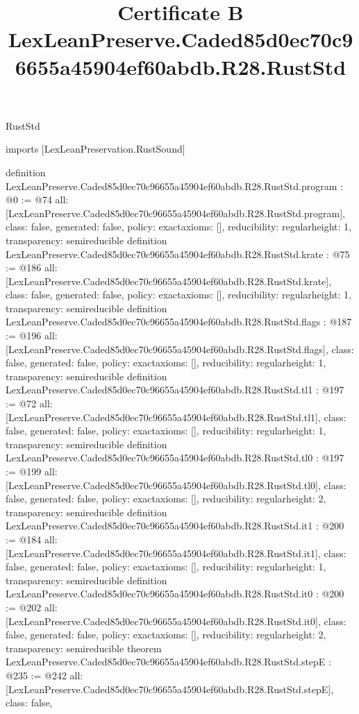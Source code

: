 \begin{lexlean}{RustStd}
\title{Certificate B LexLeanPreserve.Caded85d0ec70c96655a45904ef60abdb.R28.RustStd}
\begin{coremodule}
imports [LexLeanPreservation.RustSound]

definition LexLeanPreserve.Caded85d0ec70c96655a45904ef60abdb.R28.RustStd.program : @0 := @74 {
  all: [LexLeanPreserve.Caded85d0ec70c96655a45904ef60abdb.R28.RustStd.program],
  class: false,
  generated: false,
  policy: exact{axioms: []},
  reducibility: regular{height: 1},
  transparency: semireducible
}
definition LexLeanPreserve.Caded85d0ec70c96655a45904ef60abdb.R28.RustStd.krate : @75 := @186 {
  all: [LexLeanPreserve.Caded85d0ec70c96655a45904ef60abdb.R28.RustStd.krate],
  class: false,
  generated: false,
  policy: exact{axioms: []},
  reducibility: regular{height: 1},
  transparency: semireducible
}
definition LexLeanPreserve.Caded85d0ec70c96655a45904ef60abdb.R28.RustStd.flags : @187 := @196 {
  all: [LexLeanPreserve.Caded85d0ec70c96655a45904ef60abdb.R28.RustStd.flags],
  class: false,
  generated: false,
  policy: exact{axioms: []},
  reducibility: regular{height: 1},
  transparency: semireducible
}
definition LexLeanPreserve.Caded85d0ec70c96655a45904ef60abdb.R28.RustStd.tl1 : @197 := @72 {
  all: [LexLeanPreserve.Caded85d0ec70c96655a45904ef60abdb.R28.RustStd.tl1],
  class: false,
  generated: false,
  policy: exact{axioms: []},
  reducibility: regular{height: 1},
  transparency: semireducible
}
definition LexLeanPreserve.Caded85d0ec70c96655a45904ef60abdb.R28.RustStd.tl0 : @197 := @199 {
  all: [LexLeanPreserve.Caded85d0ec70c96655a45904ef60abdb.R28.RustStd.tl0],
  class: false,
  generated: false,
  policy: exact{axioms: []},
  reducibility: regular{height: 2},
  transparency: semireducible
}
definition LexLeanPreserve.Caded85d0ec70c96655a45904ef60abdb.R28.RustStd.it1 : @200 := @184 {
  all: [LexLeanPreserve.Caded85d0ec70c96655a45904ef60abdb.R28.RustStd.it1],
  class: false,
  generated: false,
  policy: exact{axioms: []},
  reducibility: regular{height: 1},
  transparency: semireducible
}
definition LexLeanPreserve.Caded85d0ec70c96655a45904ef60abdb.R28.RustStd.it0 : @200 := @202 {
  all: [LexLeanPreserve.Caded85d0ec70c96655a45904ef60abdb.R28.RustStd.it0],
  class: false,
  generated: false,
  policy: exact{axioms: []},
  reducibility: regular{height: 2},
  transparency: semireducible
}
theorem LexLeanPreserve.Caded85d0ec70c96655a45904ef60abdb.R28.RustStd.stepE : @235 := @242 {
  all: [LexLeanPreserve.Caded85d0ec70c96655a45904ef60abdb.R28.RustStd.stepE],
  class: false,
}
\end{coremodule}
\end{lexlean}

